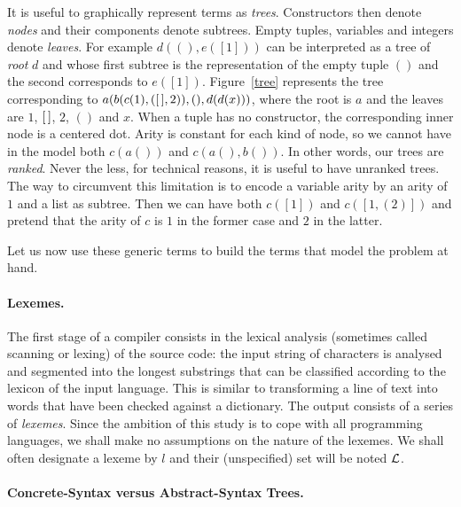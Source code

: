 It is
useful to graphically represent terms as \emph{trees}. Constructors
then denote \emph{nodes} and their components denote subtrees. Empty
tuples, variables and integers denote \emph{leaves}. For example
\(d((), e([1]))\) can be interpreted as a tree of \emph{root} \(d\)
and whose first subtree is the representation of the empty tuple
\(()\) and the second corresponds to \(e([1])\). Figure~\ref{tree}
represents the tree corresponding to \(a(b(c(1), ([\,], 2)), (),
d(d(x)))\), where the root is \(a\) and the leaves are \(1\), \([\,]\),
\(2\), \(()\) and \(x\). When a tuple has no constructor, the
corresponding inner node is a centered dot. Arity is constant for each
kind of node, so we cannot have in the model both \(c(a())\) and
\(c(a(),b())\). In other words, our trees are \emph{ranked}. Never the
less, for technical reasons, it is useful to have unranked trees. The
way to circumvent this limitation is to encode a variable arity by an
arity of \(1\) and a list as subtree. Then we can have both \(c([1])\)
and \(c([1, (2)])\) and pretend that the arity of \(c\) is \(1\) in
the former case and \(2\) in the latter.

Let us now use these generic terms to build the terms that model the
problem at hand.

\paragraph{Lexemes.}

The first stage of a compiler consists in the lexical analysis
(sometimes called scanning or lexing) of the source code: the input
string of characters is analysed and segmented into the longest
substrings that can be classified according to the lexicon of the
input language. This is similar to transforming a line of text into
words that have been checked against a dictionary. The output consists
of a series of \emph{lexemes}. Since the ambition of this study is to
cope with all programming languages, we shall make no assumptions on
the nature of the lexemes. We shall often designate a lexeme by \(l\)
and their (unspecified) set will be noted \(\cal L\).

\paragraph{Concrete\hyp{}Syntax versus Abstract\hyp{}Syntax Trees.}

